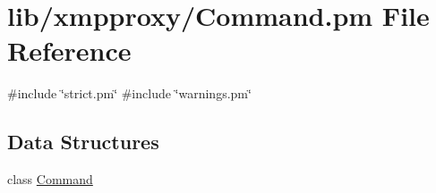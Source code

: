 \hypertarget{_command_8pm}{
\section{lib/xmpproxy/\-Command.pm \-File \-Reference}
\label{_command_8pm}
}
{\ttfamily \#include \char`\"{}strict.\-pm\char`\"{}}\*
{\ttfamily \#include \char`\"{}warnings.\-pm\char`\"{}}\*
\subsection*{\-Data \-Structures}
\begin{DoxyCompactItemize}
\item 
class \hyperlink{classxmpproxy_1_1_command}{\-Command}
\end{DoxyCompactItemize}
